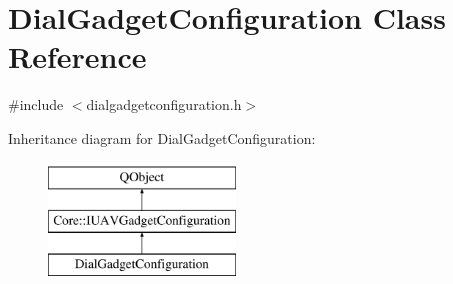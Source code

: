 \hypertarget{class_dial_gadget_configuration}{\section{Dial\-Gadget\-Configuration Class Reference}
\label{class_dial_gadget_configuration}
}


{\ttfamily \#include $<$dialgadgetconfiguration.\-h$>$}

Inheritance diagram for Dial\-Gadget\-Configuration\-:\begin{figure}[H]
\begin{center}
\leavevmode
\includegraphics[height=3.000000cm]{class_dial_gadget_configuration}
\end{center}
\end{figure}
